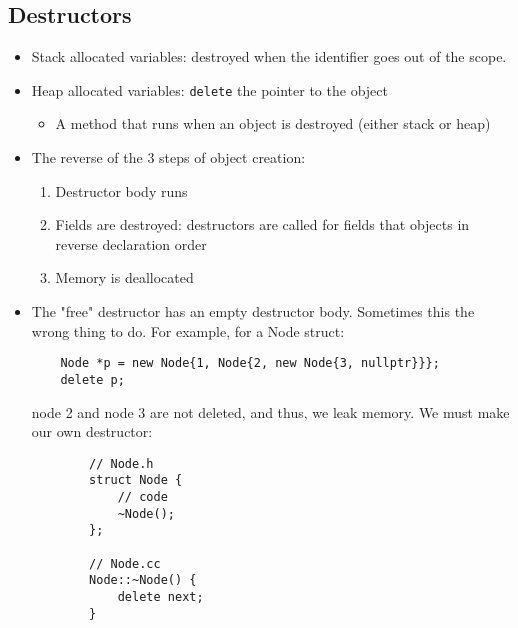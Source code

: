 \documentclass[12pt]{article}
\begin{document}
\subsection{Destructors}
\begin{itemize}
    \item Stack allocated variables: destroyed when the identifier goes out of the scope.
    \item Heap allocated variables: \lstinline{delete} the pointer to the object
    \begin{itemize}
        \item A method that runs when an object is destroyed (either stack or heap)
    \end{itemize}
    \item The reverse of the 3 steps of object creation:
    \begin{enumerate}
        \item Destructor body runs
        \item Fields are destroyed: destructors are called for fields that objects in reverse declaration order
        \item Memory is deallocated 
    \end{enumerate}
    \item The "free" destructor has an empty destructor body. Sometimes this the wrong thing to do. For example, for a Node struct:
    \begin{lstlisting}
    Node *p = new Node{1, Node{2, new Node{3, nullptr}}};
    delete p;
    \end{lstlisting}
    node 2 and node 3 are not deleted, and thus, we leak memory. We must make our own destructor:
    \begin{lstlisting}
        // Node.h
        struct Node {
            // code
            ~Node();
        };
        
        // Node.cc
        Node::~Node() {
            delete next;
        }
    \end{lstlisting}
\end{itemize}
\end{document}
